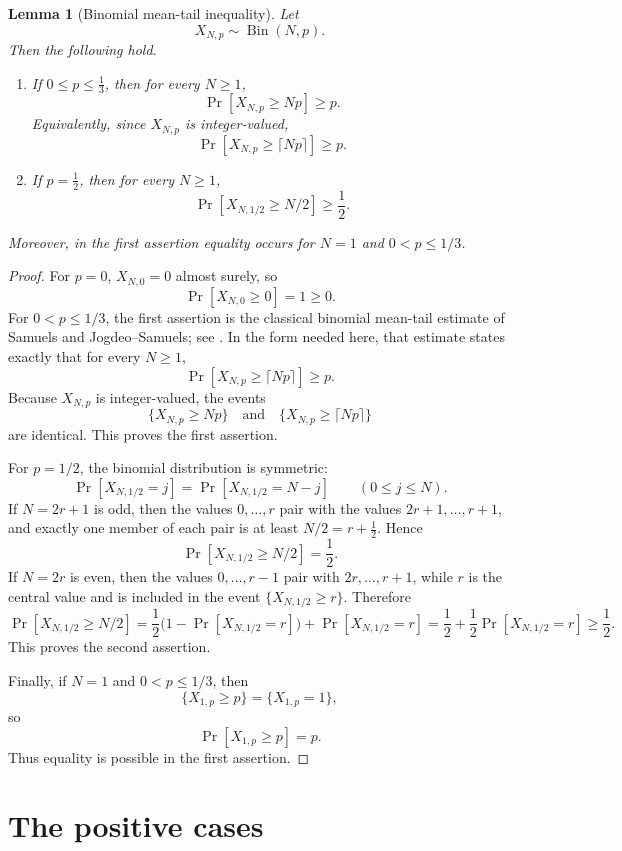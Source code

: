 \documentclass[12pt]{article}
\theoremstyle{definition}
\theoremstyle{plain}
\newtheorem{lemma}[definition]{Lemma}
\theoremstyle{remark}
\begin{document}
\begin{lemma}[Binomial mean-tail inequality]\label{lem:binomial}
Let
\[
X_{N,p}\sim\operatorname{Bin}(N,p).
\]
Then the following hold.

\begin{enumerate}
\item If \(0\le p\le \frac13\), then for every \(N\ge1\),
\[
\Pr[X_{N,p}\ge Np]\ge p.
\]
Equivalently, since \(X_{N,p}\) is integer-valued,
\[
\Pr[X_{N,p}\ge \lceil Np\rceil]\ge p.
\]

\item If \(p=\frac12\), then for every \(N\ge1\),
\[
\Pr[X_{N,1/2}\ge N/2]\ge \frac12.
\]
\end{enumerate}
Moreover, in the first assertion equality occurs for \(N=1\) and \(0<p\le1/3\).
\end{lemma}

\begin{proof}
For \(p=0\), \(X_{N,0}=0\) almost surely, so
\[
\Pr[X_{N,0}\ge0]=1\ge0.
\]
For \(0<p\le1/3\), the first assertion is the classical binomial mean-tail estimate of Samuels and Jogdeo--Samuels; see \cite{Samuels1965,JogdeoSamuels1968}. In the form needed here, that estimate states exactly that for every \(N\ge1\),
\[
\Pr[X_{N,p}\ge \lceil Np\rceil]\ge p.
\]
Because \(X_{N,p}\) is integer-valued, the events
\[
\{X_{N,p}\ge Np\}
\quad\text{and}\quad
\{X_{N,p}\ge \lceil Np\rceil\}
\]
are identical. This proves the first assertion.

For \(p=1/2\), the binomial distribution is symmetric:
\[
\Pr[X_{N,1/2}=j]=\Pr[X_{N,1/2}=N-j]
\qquad (0\le j\le N).
\]
If \(N=2r+1\) is odd, then the values \(0,\ldots,r\) pair with the values \(2r+1,\ldots,r+1\), and exactly one member of each pair is at least \(N/2=r+\frac12\). Hence
\[
\Pr[X_{N,1/2}\ge N/2]=\frac12.
\]
If \(N=2r\) is even, then the values \(0,\ldots,r-1\) pair with \(2r,\ldots,r+1\), while \(r\) is the central value and is included in the event \(\{X_{N,1/2}\ge r\}\). Therefore
\[
\Pr[X_{N,1/2}\ge N/2]
=
\frac12\bigl(1-\Pr[X_{N,1/2}=r]\bigr)
+\Pr[X_{N,1/2}=r]
=
\frac12+\frac12\Pr[X_{N,1/2}=r]
\ge\frac12.
\]
This proves the second assertion.

Finally, if \(N=1\) and \(0<p\le1/3\), then
\[
\{X_{1,p}\ge p\}=\{X_{1,p}=1\},
\]
so
\[
\Pr[X_{1,p}\ge p]=p.
\]
Thus equality is possible in the first assertion.
\end{proof}

\section{The positive cases}
\end{document}
